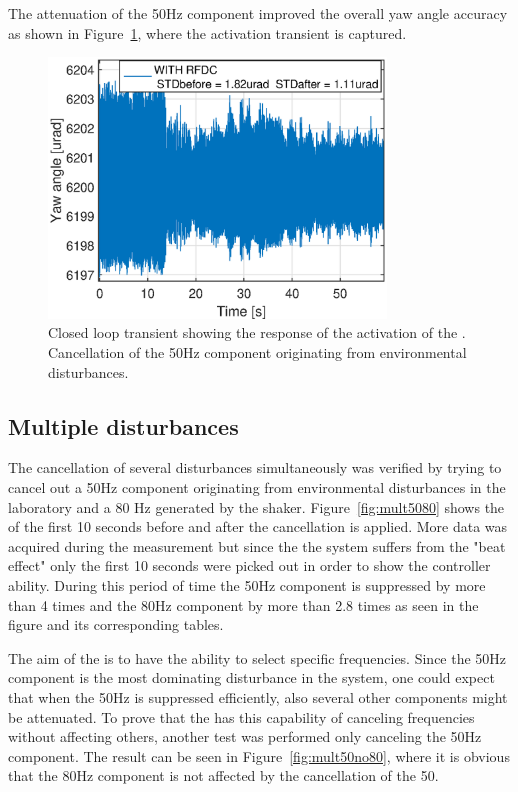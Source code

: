 The attenuation of the 50Hz component improved the overall yaw angle accuracy as shown in Figure~\ref{fig:transient_closedloop_50}, where the activation transient is captured.
\FloatBarrier
\begin{figure}[h]
  \centering %
  \includegraphics[width=0.8\textwidth]{fig/matlab/transient_closedloop_50Hz}
  \caption{\label{fig:transient_closedloop_50}Closed loop transient showing the response of the activation of the \abbrRFDC. Cancellation of the 50Hz component originating from environmental disturbances.}
\end{figure}


\subsection{Multiple disturbances}
The cancellation of several disturbances simultaneously was verified by trying to cancel out a 50Hz component originating from environmental disturbances in the laboratory and a 80 Hz generated by the shaker. Figure~\ref{fig:mult5080} shows the \abbrFFT of the first 10 seconds before and after the cancellation is applied. More data was acquired during the measurement but since the the system suffers from the "beat effect" only the first 10 seconds were picked out in order to show the controller ability. During this period of time the 50Hz component is suppressed by more than 4 times and the 80Hz component by more than 2.8 times as seen in the figure and its corresponding tables.

The aim of the \abbrRFDC is to have the ability to select specific frequencies. Since the 50Hz component is the most dominating disturbance in the system, one could expect that when the 50Hz is suppressed efficiently, also several other components might be attenuated. To prove that the \abbrRFDC has this capability of canceling frequencies without affecting others, another test was performed only canceling the 50Hz component. The result can be seen in Figure~\ref{fig:mult50no80}, where it is obvious that the 80Hz component is not affected by the cancellation of the 50.

